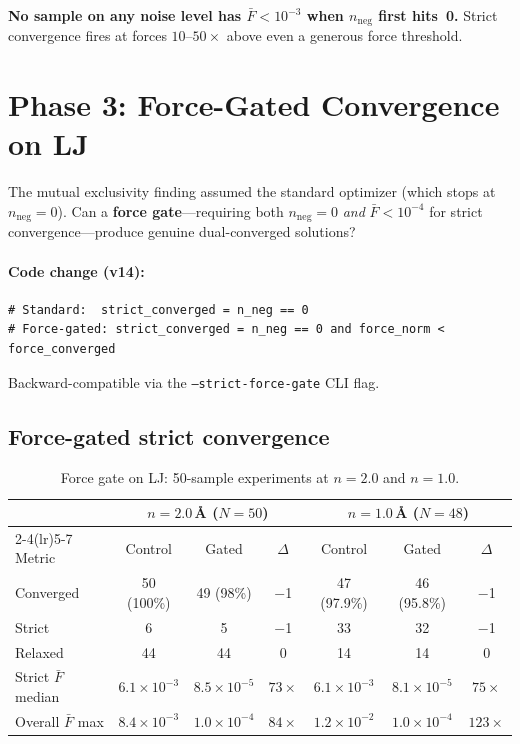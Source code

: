 \documentclass[11pt,a4paper]{article}
\theoremstyle{definition}
\begin{document}
\noindent
\textbf{No sample on any noise level has $\bar{F} < 10^{-3}$ when
$n_\text{neg}$ first hits~0.}  Strict convergence fires at forces
$10$--$50\times$ above even a generous force threshold.

\section{Phase 3: Force-Gated Convergence on LJ}
\label{sec:force-gate}

The mutual exclusivity finding assumed the standard optimizer (which stops
at $n_\text{neg}{=}0$).  Can a \textbf{force gate}---requiring both
$n_\text{neg}{=}0$ \emph{and} $\bar{F} < 10^{-4}$ for strict
convergence---produce genuine dual-converged solutions?

\paragraph{Code change (v14):}
\begin{verbatim}
# Standard:  strict_converged = n_neg == 0
# Force-gated: strict_converged = n_neg == 0 and force_norm < force_converged
\end{verbatim}
Backward-compatible via the \texttt{--strict-force-gate} CLI flag.

\subsection{Force-gated strict convergence}

\begin{table}[h]
\centering
\caption{Force gate on LJ: 50-sample experiments at $n{=}2.0$ and $n{=}1.0$.}
\label{tab:force-gate}
\begin{tabular}{l cccccc}
\toprule
& \multicolumn{3}{c}{$n{=}2.0$\,\AA{} ($N{=}50$)} & \multicolumn{3}{c}{$n{=}1.0$\,\AA{} ($N{=}48$)} \\
\cmidrule(lr){2-4}\cmidrule(lr){5-7}
Metric & Control & Gated & $\Delta$ & Control & Gated & $\Delta$ \\
\midrule
Converged & 50 (100\%) & 49 (98\%) & $-$1
          & 47 (97.9\%) & 46 (95.8\%) & $-$1 \\
Strict    & 6 & 5 & $-$1 & 33 & 32 & $-$1 \\
Relaxed   & 44 & 44 & 0 & 14 & 14 & 0 \\
\midrule
Strict $\bar{F}$ median & $6.1 \times 10^{-3}$ & $8.5 \times 10^{-5}$
  & \cellcolor{successlight}$73\times$ & $6.1 \times 10^{-3}$ & $8.1 \times 10^{-5}$
  & \cellcolor{successlight}$75\times$ \\
Overall $\bar{F}$ max & $8.4 \times 10^{-3}$ & $1.0 \times 10^{-4}$
  & \cellcolor{successlight}$84\times$ & $1.2 \times 10^{-2}$ & $1.0 \times 10^{-4}$
  & \cellcolor{successlight}$123\times$ \\
\bottomrule
\end{tabular}
\end{table}
\end{document}
